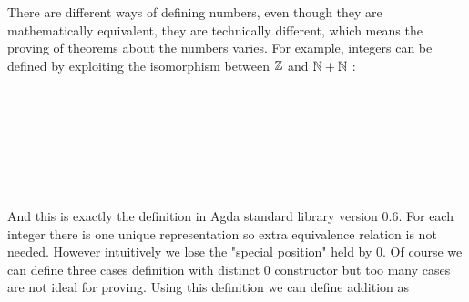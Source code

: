 \documentclass{article}
\begin{document}
There are different ways of defining numbers, even though they are
mathematically equivalent, they are technically different, which means
the proving of theorems about the numbers varies. For example,
integers can be defined by exploiting the isomorphism between $\mathbb{Z}$ and
$\mathbb{N}+\mathbb{N}$ :

\begin{code}\>\<%
\\
%
\\
\>  \AgdaSymbol{:}  \<%
\\
\>[0]\<[2]%
\>[2]\AgdaInductiveConstructor{-[1+\_]} \<[12]%
\>[12]\AgdaSymbol{:} \AgdaSymbol{(} \AgdaSymbol{:} \AgdaSymbol{)}   \<[27]%
\>[27]\<%
\\
\>[0]\<[2]%
\>[2]\AgdaInductiveConstructor{+\_} \<[15]%
\>[15]\AgdaSymbol{:} \AgdaSymbol{(} \AgdaSymbol{:} \AgdaSymbol{)}   \<[30]%
\>[30]\<%
\\
%
\\
\>\<\end{code}

And this is exactly the definition in Agda standard library version 0.6. For each integer there is one unique representation so extra equivalence relation is not needed. However intuitively we lose the "special position" held by 0. Of course we can define three cases definition with distinct 0 constructor but too many cases are not ideal for proving. Using this definition we can define addition as
\end{document}
